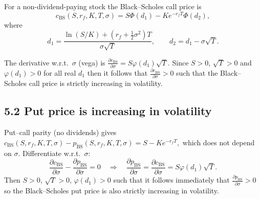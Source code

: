 For a non-dividend-paying stock the Black--Scholes call price is
\[
c_{\text{BS}}(S,r_f,K,T,\sigma)
=S\Phi(d_1)-K e^{-r_fT}\Phi(d_2),
\]
where
\[
d_1=\frac{\ln(S/K)+(r_f+\tfrac{1}{2}\sigma^2)T}{\sigma\sqrt{T}},
\qquad
d_2=d_1-\sigma\sqrt{T}.
\]

The derivative w.r.t.\ $\sigma$ (vega) is
$
\frac{\partial c_{\text{BS}}}{\partial\sigma}
=S\varphi(d_1)\sqrt{T}.
$
Since $S>0$, $\sqrt{T}>0$ and $\varphi(d_1)>0$ for all real $d_1$ then it follows that
$\boxed{\frac{\partial c_{\text{BS}}}{\partial\sigma}>0}
$
such that the Black--Scholes call price is strictly increasing in volatility.

\subsection*{5.2 \quad Put price is increasing in volatility}

Put–call parity (no dividends) gives
$
c_{\text{BS}}(S,r_f,K,T,\sigma)-p_{\text{BS}}(S,r_f,K,T,\sigma)
=S-K e^{-r_fT},
$
which does not depend on $\sigma$. Differentiate w.r.t.\ $\sigma$:
\[
\frac{\partial c_{\text{BS}}}{\partial\sigma}
-\frac{\partial p_{\text{BS}}}{\partial\sigma}=0
\quad\Rightarrow\quad
\frac{\partial p_{\text{BS}}}{\partial\sigma}
=\frac{\partial c_{\text{BS}}}{\partial\sigma}
=S\varphi(d_1)\sqrt{T}.
\]
Then $S>0$, $\sqrt{T}>0$, $\varphi(d_1)>0$ such that it follows immediately that
$
\boxed{\frac{\partial p_{\text{BS}}}{\partial\sigma}>0}
$
so the Black--Scholes put price is also strictly increasing in volatility.
